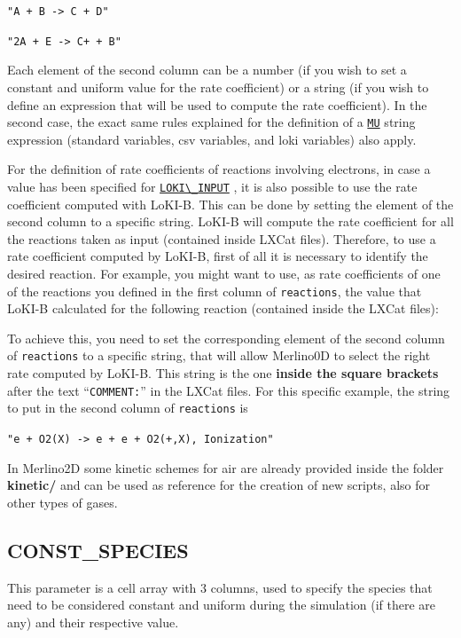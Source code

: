\documentclass[12pt,a4paper]{article}
\newcommand{\matlabs}[1]{{\lstinline[style=MatlabStyle]!#1!}}
\newcommand{\seclink}[2]{%
	\begingroup
	\hypersetup{linkcolor=orange}%
	\hyperref[sec:#1]{\matlabs{#2}}%
	\endgroup
}
\begin{document}
	\matlabs{"A + B -> C + D"}
	
	\matlabs{"2A + E -> C+ + B"}
	
	
	\noindent Each element of the second column can be a number (if you wish to set a constant and uniform value for the rate coefficient) or a string (if you wish to define an expression that will be used to compute the rate coefficient). 
	In the second case, the exact same rules explained for the definition of a \seclink{mu}{MU} string expression (standard variables, csv variables, and loki variables) also apply.
	
	For the definition of rate coefficients of reactions involving electrons, in case a value has been specified for \seclink{lokiinput}{LOKI\_INPUT}, it is also possible to use the rate coefficient computed with LoKI-B. This can be done by setting the element of the second column to a specific string.
	LoKI-B will compute the rate coefficient for all the reactions taken as input (contained inside LXCat files).
	Therefore, to use a rate coefficient computed by LoKI-B, first of all it is necessary to identify the desired reaction.
	For example, you might want to use, as rate coefficients of one of the reactions you defined in the first column of \matlabs{reactions}, the value that LoKI-B calculated for the following reaction (contained inside the LXCat files):
	
	
	
	\noindent To achieve this, you need to set the corresponding element of the second column of \matlabs{reactions} to a specific string, that will allow Merlino0D to select the right rate computed by LoKI-B.
	This string is the one \textbf{inside the square brackets} after the text ``\matlabs{COMMENT:}'' in the LXCat files.
	For this specific example, the string to put in the second column of \matlabs{reactions} is
	
	\texttt{\textcolor{matlab_string_color}{"e + O2(X) -> e + e + O2(+,X), Ionization"}}
	
	In Merlino2D some kinetic schemes for air are already provided inside the folder \textbf{kinetic/} and can be used as reference for the creation of new scripts, also for other types of gases.
	
	\subsection{CONST\_SPECIES}
	\label{sec:constspecies}
	This parameter is a cell array with 3 columns, used to specify the species that need to be considered constant and uniform during the simulation (if there are any) and their respective value.
	
\end{document}
